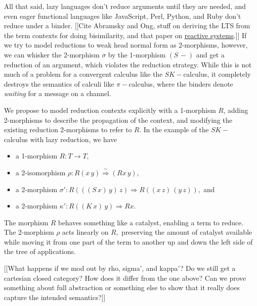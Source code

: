 \documentclass[11pt]{article}
\newcommand{\maps}{\colon}
\begin{document}
All that said, lazy languages don't reduce arguments until they are needed, and even eager functional languages like JavaScript, Perl, Python, and Ruby don't reduce under a binder.  [[Cite Abramsky and Ong, stuff on deriving the LTS from the term contexts for doing bisimilarity, and that paper on  \href{https://users.dimi.uniud.it/~pietro.digianantonio/papers/socl.pdf}{reactive systems}.]]  If we try to model reductions to weak head normal form as 2-morphisms, however, we can whisker the 2-morphism $\sigma$ by the 1-morphism $(S\, -)$ and get a reduction of an argument, which violates the reduction strategy.  While this is not much of a problem for a convergent calculus like the $SK-$calculus, it completely destroys the semantics of calculi like $\pi-$calculus, where the binders denote {\em waiting} for a message on a channel.

We propose to model reduction contexts explicitly with a 1-morphism $R$, adding 2-morphisms to describe the propagation of the context, and modifying the existing reduction 2-morphisms to refer to $R$.  In the example of the $SK-$calculus with lazy reduction, we have
\begin{itemize}
  \item a 1-morphism $R\maps T \to T,$
  \item a 2-isomorphism $\rho\maps R(x\, y) \stackrel{\sim}{\Rightarrow} (Rx\, y),$
  \item a 2-morphism $\sigma'\maps R(((S\, x)\, y)\, z) \Rightarrow R((x\, z)\, (y\, z)),$ and
  \item a 2-morphism $\kappa'\maps R((K\, x)\, y) \Rightarrow Rx.$
\end{itemize}
The morphism $R$ behaves something like a catalyst, enabling a term to reduce.  The 2-morphism $\rho$ acts linearly on $R,$ preserving the amount of catalyst available while moving it from one part of the term to another up and down the left side of the tree of applications.

[[What happens if we mod out by rho, sigma', and kappa'?  Do we still get a cartesian closed category?  How does it differ from the one above?  Can we prove something about full abstraction or something else to show that it really does capture the intended semantics?]]


\begin{thebibliography}{99}
\end{thebibliography} 
\end{document}
